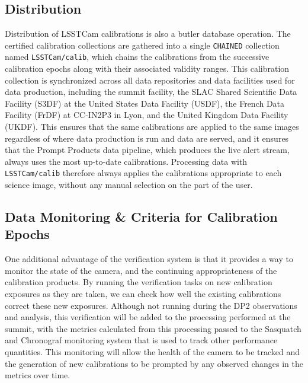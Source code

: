\subsection{Distribution} \label{sec:verify-accept-certify:distribution}
Distribution of LSSTCam calibrations is also a butler database operation. The certified calibration collections are gathered into a single \texttt{CHAINED} collection named \texttt{LSSTCam/calib}, which chains the calibrations from the successive calibration epochs along with their associated validity ranges.
This calibration collection is synchronized across all data repositories and data facilities used for data production, including the summit facility, the SLAC Shared Scientific Data Facility (S3DF) at the United States Data Facility (USDF), the French Data Facility (FrDF) at CC-IN2P3 in Lyon, and the United Kingdom Data Facility (UKDF).
This ensures that the same calibrations are applied to the same images regardless of where data production is run and data are served, and it ensures that the Prompt Products data pipeline, which produces the live alert stream, always uses the most up-to-date calibrations.
Processing data with \texttt{LSSTCam/calib} therefore always applies the calibrations appropriate to each science image, without any manual selection on the part of the user.

\subsection{Data Monitoring \& Criteria for Calibration Epochs} \label{sec:verify-accept-certify:data-monitoring}
One additional advantage of the verification system is that it provides a way to monitor the state of the camera, and the continuing appropriateness of the calibration products.
By running the verification tasks on new calibration exposures as they are taken, we can check how well the existing calibrations correct these new exposures.
Although not running during the DP2 observations and analysis, this verification will be added to the processing performed at the summit, with the metrics calculated from this processing passed to the Sasquatch \citep{2024SPIE13101E..1MF, DMTN-290} and Chronograf monitoring system that is used to track other performance quantities.
This monitoring will allow the health of the camera to be tracked and the generation of new calibrations to be prompted by any observed changes in the metrics over time.

